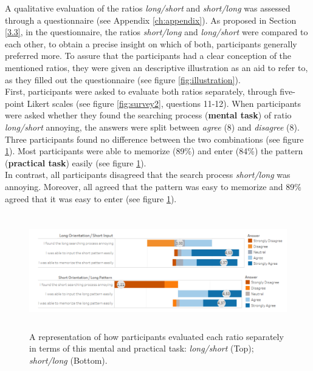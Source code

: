 A qualitative evaluation of the ratios \textit{long/short} and \textit{short/long} was assessed through a questionnaire (see Appendix \ref{ch:appendix}). As proposed in Section \ref{3.3}, in the questionnaire, the ratios \textit{short/long} and \textit{long/short} were compared to each other, to obtain a precise insight on which of both, participants generally preferred more. To assure that the participants had a clear conception of the mentioned ratios, they were given an descriptive illustration as an aid to refer to, as they filled out the questionnaire (see figure \ref{fig:illustration}).\\
First, participants were asked to evaluate both ratios separately, through five-point Likert scales (see figure \ref{fig:survey2}, questions 11-12). When participants were asked whether they found the searching process (\textbf{mental task}) of ratio \textit{long/short} annoying, the answers were split between \textit{agree} (8) and \textit{disagree} (8). Three participants found no difference between the two combinations (see figure \ref{fig:likert}). Most participants were able to memorize (89\%) and enter (84\%) the pattern (\textbf{practical task}) easily (see figure \ref{fig:likert}). \\
In contrast, all participants disagreed that the search process \textit{short/long} was annoying. Moreover, all agreed that the pattern was easy to memorize and 89\% agreed that it was easy to enter (see figure \ref{fig:likert}).\\
 
 \begin{figure}[t!]
\centering
\includegraphics[width=15cm, height=5cm]{Chapters/graphics/Likert1213.PNG}
\caption{A representation of how participants evaluated each ratio separately in terms of this mental and practical task: \textit{long/short} (Top); \textit{short/long} (Bottom).  }
\label{fig:likert}
\end{figure}


